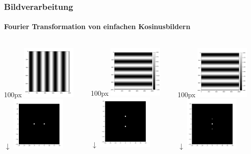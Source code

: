 \begin{frame}
    \frametitle{Bildverarbeitung}
    \framesubtitle{Fourier Transformation von einfachen Kosinusbildern}
    \begin{columns}
        \begin{column}{100px}
            \centering
            \includegraphics[width=100px]{images/04-applications-image-cos.png}
            $\downarrow$
            \includegraphics[width=100px]{images/04-applications-image-cos-ft.png}
        \end{column}
        \begin{column}{100px}
            \centering
            \includegraphics[width=100px]{images/04-applications-image-cos-rot.png}
            $\downarrow$
            \includegraphics[width=100px]{images/04-applications-image-cos-rot-ft.png}
        \end{column}
        \begin{column}{100px}
            \centering
            \includegraphics[width=100px]{images/04-applications-image-cos-rot-dc.png}
            $\downarrow$
            \includegraphics[width=100px]{images/04-applications-image-cos-rot-dc-ft.png}
        \end{column}
    \end{columns}
\end{frame}

